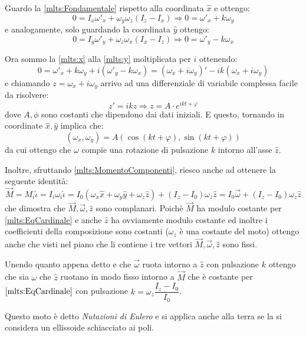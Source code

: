 \documentclass[../main.tex]{subfiles}
\begin{document}
Guardo la \cref{mlts:Fondamentale} rispetto alla coordinata $\hat x$ e ottengo:
\begin{equation}\label{mlts:x}
	0=I_x\omega'_x+\omega_y\omega_z(I_z-I_x)\Rightarrow 0=\omega'_x+k\omega_y
\end{equation}
e analogamente, solo guardando la coordinata $\hat y$ ottengo:
\begin{equation}\label{mlts:y}
	0=I_y\omega'_y+\omega_z\omega_x(I_x-I_z)\Rightarrow 0=\omega'_y-k\omega_x
\end{equation}

Ora sommo la \cref{mlts:x} alla \cref{mlts:y} moltiplicata per $i$ ottenendo:
\begin{equation*}
	0=\omega'_x+k\omega_y+i(\omega'_y-k\omega_x)=(\omega_x+i\omega_y)'-ik(\omega_x+i\omega_y)
\end{equation*}
e chiamando $z=\omega_x+i\omega_y$ arrivo ad una differenziale di variabile complessa facile da risolvere:
\begin{equation*}
	z'=ikz \Rightarrow z=A\cdot e^{ikt+\varphi}
\end{equation*}
dove $A,\phi$ sono costanti che dipendono dai dati iniziali. E questo, tornando in coordinate $\hat x,\hat y$ implica che:
\begin{equation}\label{mlts:MotoOmega}
	(\omega_x,\omega_y)=A(\cos(kt+\varphi),\sin(kt+\varphi))
\end{equation}
da cui ottengo che $\omega$ compie una rotazione di pulsazione $k$ intorno all'asse $\hat z$.

Inoltre, sfruttando \cref{mlts:MomentoComponenti}, riesco anche ad ottenere la seguente identità:
\begin{equation}\label{mlts:Complanarita}
	\overrightarrow M = M_i\hat\iota = I_i \omega_i\hat\iota= 
	I_0\left(\omega_x\hat x+\omega_y\hat y+\omega_z\hat z\right)+(I_z-I_0)\omega_z \hat z=
	I_0\vec\omega + (I_z-I_0)\omega_z \hat z
\end{equation}
che dimostra che $\overrightarrow{M},\vec\omega,\hat z$ sono complanari. Poichè $\vec M$ ha modulo costante per \cref{mlts:EqCardinale} e anche $\hat z$ ha ovviamente modulo costante ed inoltre i coefficienti della composizione sono costanti ($\omega_z$ è una costante del moto) ottengo anche che visti nel piano che li contiene i tre vettori $\overrightarrow M, \vec\omega, \hat z$ sono fissi.

Unendo quanto appena detto e che $\vec\omega$ ruota intorno a $\hat z$ con pulsazione $k$ ottengo che sia $\omega$ che $\hat z$ ruotano in modo fisso intorno a $\vec M$ che è costante per $\cref{mlts:EqCardinale}$ con pulsazione $k=\omega_z\dfrac{I_z-I_0}{I_0}$.

Questo moto è detto \emph{Nutazioni di Eulero} e si applica anche alla terra se la si considera un ellissoide schiacciato ai poli.
\end{document}
